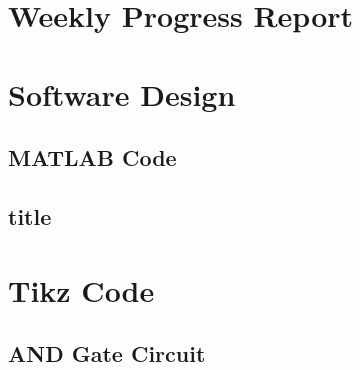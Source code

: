 \section{Weekly Progress Report}

\begin{comment}





\end{comment}





\section{Software Design}
\subsection{MATLAB Code}
\subsection{title}

\section{Tikz Code}
\subsection{AND Gate Circuit}

